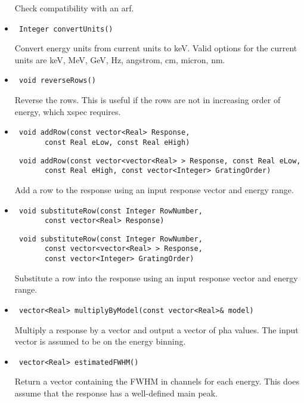 \documentclass[11pt]{book}
\begin{document}
\begin{itemize}
          Check compatibility with an arf.

\item  \begin{verbatim} Integer convertUnits() \end{verbatim}

          Convert energy units from current units to keV. Valid
          options for the current units are keV, MeV, GeV, Hz,
          angstrom, cm, micron, nm.

\item  \begin{verbatim} void reverseRows() \end{verbatim}  

          Reverse the rows. This is useful if the rows are not in
          increasing order of energy, which xspec requires.

\item  \begin{verbatim} void addRow(const vector<Real> Response, 
       const Real eLow, const Real eHigh) \end{verbatim}
       \begin{verbatim} void addRow(const vector<vector<Real> > Response, const Real eLow, 
       const Real eHigh, const vector<Integer> GratingOrder) \end{verbatim}

          Add a row to the response using an input response vector and energy range.

\item  \begin{verbatim} void substituteRow(const Integer RowNumber, 
       const vector<Real> Response) \end{verbatim}
       \begin{verbatim} void substituteRow(const Integer RowNumber, 
       const vector<vector<Real> > Response, 
       const vector<Integer> GratingOrder) \end{verbatim}

          Substitute a row into the response using an input response 
          vector and energy range.

\item  \begin{verbatim} vector<Real> multiplyByModel(const vector<Real>& model) \end{verbatim}

          Multiply a response by a vector and output a vector of pha
          values. The input vector is assumed to be on the energy binning.

\item  \begin{verbatim} vector<Real> estimatedFWHM() \end{verbatim}

          Return a vector containing the FWHM in channels for each 
          energy. This does assume that the response has a 
          well-defined main peak.

\end{itemize}
\end{document}
